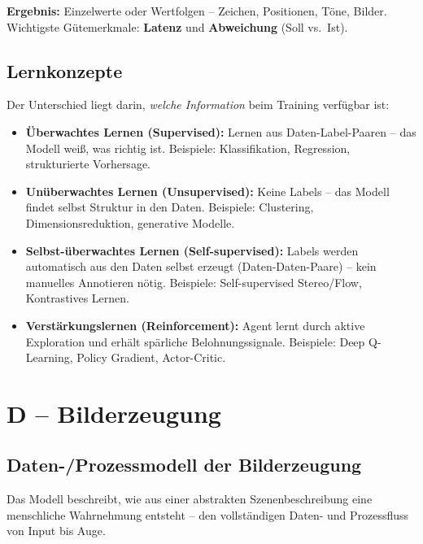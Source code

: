 \documentclass[12pt, a4paper]{article}
\begin{document}
\textbf{Ergebnis:} Einzelwerte oder Wertfolgen -- Zeichen, Positionen, Töne, Bilder. Wichtigste Gütemerkmale: \textbf{Latenz} und \textbf{Abweichung} (Soll vs.\ Ist).

\subsection{Lernkonzepte}

Der Unterschied liegt darin, \textit{welche Information} beim Training verfügbar ist:

\begin{itemize}
  \item \textbf{Überwachtes Lernen (Supervised):} Lernen aus Daten-Label-Paaren -- das Modell weiß, was richtig ist. Beispiele: Klassifikation, Regression, strukturierte Vorhersage.

  \item \textbf{Unüberwachtes Lernen (Unsupervised):} Keine Labels -- das Modell findet selbst Struktur in den Daten. Beispiele: Clustering, Dimensionsreduktion, generative Modelle.

  \item \textbf{Selbst-überwachtes Lernen (Self-supervised):} Labels werden automatisch aus den Daten selbst erzeugt (Daten-Daten-Paare) -- kein manuelles Annotieren nötig. Beispiele: Self-supervised Stereo/Flow, Kontrastives Lernen.

  \item \textbf{Verstärkungslernen (Reinforcement):} Agent lernt durch aktive Exploration und erhält spärliche Belohnungssignale. Beispiele: Deep Q-Learning, Policy Gradient, Actor-Critic.
\end{itemize}

\section{D -- Bilderzeugung}

\subsection{Daten-/Prozessmodell der Bilderzeugung}

Das Modell beschreibt, wie aus einer abstrakten Szenenbeschreibung eine menschliche Wahrnehmung entsteht -- den vollständigen Daten- und Prozessfluss von Input bis Auge.
\end{document}
